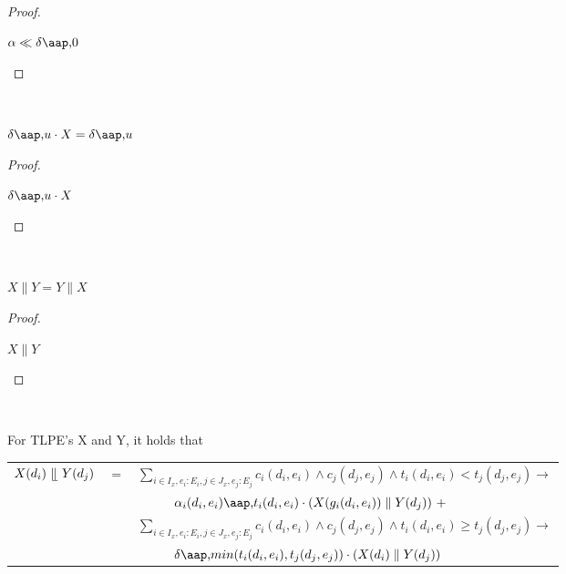 \begin{proof}
\begin{derivation}{$\alpha \before \delta \at 0$}
\end{derivation}
\end{proof}
\\
\begin{lemma} \label{lemma:deltax}
$\delta \at u \cdot X = \delta \at u$
\end{lemma}

\begin{proof}
\begin{derivation}{$\delta \at u \cdot X$}
\end{derivation}
\end{proof}
\\
\begin{lemma} \label{lemma:parallelsym}
$X \parallel Y = Y \parallel X$
\end{lemma}

\begin{proof}
\begin{derivation}{$X \parallel Y$}
\end{derivation}
\end{proof}
\\
\begin{lemma} \label{lemma:xlmergey} For TLPE's X and Y, it holds that \\
\begin{tabular}{lll}
$X(d_i) ~\llfloor~ Y(d_j)$ & $=$ & $\sum_{i \in I_x, e_i: E_i, j \in J_x, e_j: E_j} c_i(d_i,e_i) \land c_j(d_j,e_j) \land t_i(d_i,e_i) < t_j(d_j,e_j) \rightarrow$ \\
& & $\hspace{1cm} \alpha_i(d_i,e_i) \at t_i(d_i,e_i) \cdot (X(g_i(d_i,e_i)) \parallel Y(d_j))~+$ \\
& & $\sum_{i \in I_x, e_i: E_i, j \in J_x, e_j: E_j} c_i(d_i,e_i) \land c_j(d_j,e_j) \land t_i(d_i,e_i) \geq t_j(d_j,e_j) \rightarrow$ \\
& & $\hspace{1cm} \delta \at min(t_i(d_i,e_i),t_j(d_j,e_j)) \cdot (X(d_i) \parallel Y(d_j))$ \\
\end{tabular}
\end{lemma}

